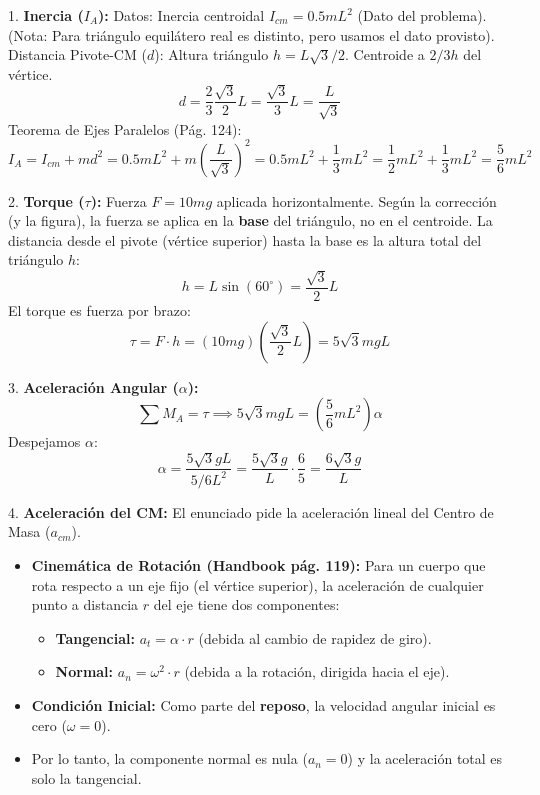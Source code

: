 \documentclass{article}
\begin{document}
1. \textbf{Inercia ($I_A$):}
   Datos: Inercia centroidal $I_{cm} = 0.5 mL^2$ (Dato del problema). (Nota: Para triángulo equilátero real es distinto, pero usamos el dato provisto).
   Distancia Pivote-CM ($d$): Altura triángulo $h = L\sqrt{3}/2$. Centroide a $2/3 h$ del vértice.
   $$ d = \frac{2}{3} \frac{\sqrt{3}}{2} L = \frac{\sqrt{3}}{3} L = \frac{L}{\sqrt{3}} $$
   Teorema de Ejes Paralelos (Pág. 124):
   $$ I_A = I_{cm} + m d^2 = 0.5 mL^2 + m \left( \frac{L}{\sqrt{3}} \right)^2 = 0.5 mL^2 + \frac{1}{3} mL^2 = \frac{1}{2} mL^2 + \frac{1}{3} mL^2 = \frac{5}{6} mL^2 $$

2. \textbf{Torque ($\tau$):}
   Fuerza $F = 10 mg$ aplicada horizontalmente.
   Según la corrección (y la figura), la fuerza se aplica en la \textbf{base} del triángulo, no en el centroide.
   La distancia desde el pivote (vértice superior) hasta la base es la altura total del triángulo $h$:
   $$ h = L \sin(60^\circ) = \frac{\sqrt{3}}{2} L $$
   El torque es fuerza por brazo:
   $$ \tau = F \cdot h = (10 mg) \left( \frac{\sqrt{3}}{2} L \right) = 5\sqrt{3} mgL $$

3. \textbf{Aceleración Angular ($\alpha$):}
   $$ \sum M_A = \tau \implies 5\sqrt{3} mgL = \left( \frac{5}{6} mL^2 \right) \alpha $$
   Despejamos $\alpha$:
   $$ \alpha = \frac{5\sqrt{3} g L}{5/6 L^2} = \frac{5\sqrt{3} g}{L} \cdot \frac{6}{5} = \frac{6\sqrt{3} g}{L} $$


4. \textbf{Aceleración del CM:}
   El enunciado pide la aceleración lineal del Centro de Masa ($a_{cm}$).
   \begin{itemize}
       \item \textbf{Cinemática de Rotación (Handbook pág. 119):} Para un cuerpo que rota respecto a un eje fijo (el vértice superior), la aceleración de cualquier punto a distancia $r$ del eje tiene dos componentes:
       \begin{itemize}
           \item \textbf{Tangencial:} $a_t = \alpha \cdot r$ (debida al cambio de rapidez de giro).
           \item \textbf{Normal:} $a_n = \omega^2 \cdot r$ (debida a la rotación, dirigida hacia el eje).
       \end{itemize}
       \item \textbf{Condición Inicial:} Como parte del \textbf{reposo}, la velocidad angular inicial es cero ($\omega = 0$).
       \item Por lo tanto, la componente normal es nula ($a_n = 0$) y la aceleración total es solo la tangencial.
   \end{itemize}
\end{document}
